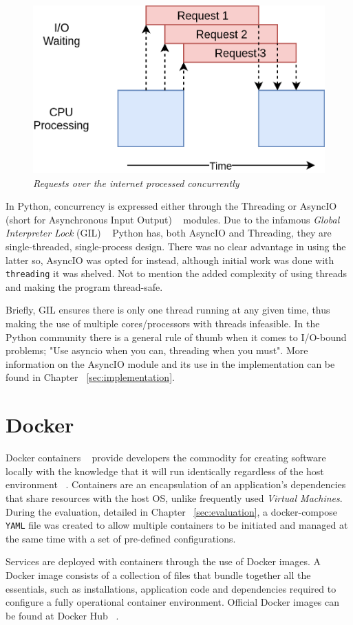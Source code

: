 \begin{figure}[ht]
 \centering
 \includegraphics[width=\linewidth]{figures/concurrency_example.png}
 \caption[Requests over the internet processed concurrently]{\textit{Requests over the internet processed concurrently} ~\cite{concurrency_realpython}}
 \label{fig:concurrency_example}
\end{figure}

In Python, concurrency is expressed either through the Threading or AsyncIO (short for Asynchronous Input Output) ~\cite{asyncio} modules. Due to the infamous \emph{Global Interpreter Lock} (GIL) ~\cite{gil_realpython} Python has, both AsyncIO and Threading, they are single-threaded, single-process design. There was no clear advantage in using the latter so, AsyncIO was opted for instead, although initial work was done with {\tt threading} it was shelved. Not to mention the added complexity of using threads and making the program thread-safe. 

Briefly, GIL ensures there is only one thread running at any given time, thus making the use of multiple cores/processors with threads infeasible. In the Python community there is a general rule of thumb when it comes to I/O-bound problems; "Use asyncio when you can, threading when you must". More information on the AsyncIO module and its use in the \pname implementation can be found in Chapter ~\ref{sec:implementation}.

\section{Docker}
Docker containers ~\cite{docker_containers} provide developers the commodity for creating software locally with the knowledge that it will run identically regardless of the host environment ~\cite{using_docker_book}. Containers are an encapsulation of an application's dependencies that share resources with the host OS, unlike frequently used \emph{Virtual Machines}. During the evaluation, detailed in Chapter ~\ref{sec:evaluation}, a docker-compose {\tt YAML} file was created to allow multiple containers to be initiated and managed at the same time with a set of pre-defined configurations. 

Services are deployed with containers through the use of Docker images. A Docker image consists of a collection of files that bundle together all the essentials, such as installations, application code and dependencies required to configure a fully operational container environment. Official Docker images can be found at Docker Hub ~\cite{docker_hub}.